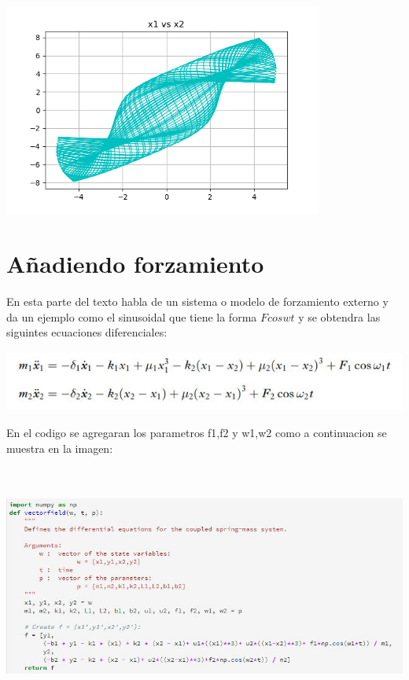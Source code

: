 \documentclass{article}
\begin{document}
\begin{center}
\includegraphics[height=7cm]{nolineal3_3_3.png}
\end{center}

\section{Añadiendo forzamiento}

En esta parte del texto habla de un sistema o modelo de forzamiento externo y da un ejemplo como el sinusoidal que tiene la forma $Fcoswt$ y se obtendra las siguintes ecuaciones diferenciales:

\begin{center}
\includegraphics[height=2cm]{ec17.png}
\end{center}

En el codigo se agregaran los parametros f1,f2 y w1,w2
como a continuacion se muestra en la imagen:


\begin{center}
\includegraphics[height=8cm]{cod10.png}
\end{center}
\end{document}
